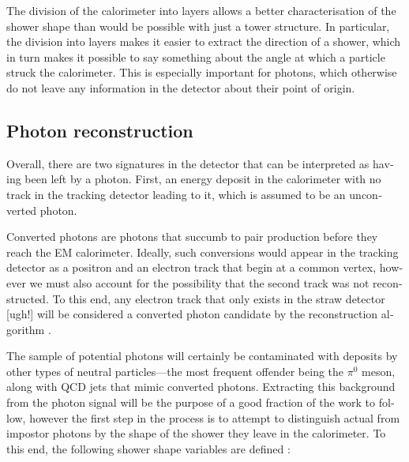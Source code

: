 \begin{english}
The division of the calorimeter into layers allows a better characterisation of the shower shape than would be possible with just a tower structure. In particular, the division into layers makes it easier to extract the direction of a shower, which in turn makes it possible to say something about the angle at which a particle struck the calorimeter. This is especially important for photons, which otherwise do not leave any information in the detector about their point of origin.

\subsection{Photon reconstruction}

Overall, there are two signatures in the detector that can be interpreted as having been left by a photon. First, an energy deposit in the calorimeter with no track in the tracking detector leading to it, which is assumed to be an unconverted photon.

Converted photons are photons that succumb to pair production before they reach the EM calorimeter. Ideally, such conversions would appear in the tracking detector as a positron and an electron track that begin at a common vertex, however we must also account for the possibility that the second track was not reconstructed. To this end, any electron track that only exists in the straw detector [ugh!] will be considered a converted photon candidate by the reconstruction algorithm \cite{phorec}.

The sample of potential photons will certainly be contaminated with deposits by other types of neutral particles---the most frequent offender being the $\pi^0$ meson, along with QCD jets that mimic converted photons. Extracting this background from the photon signal will be the purpose of a good fraction of the work to follow, however the first step in the process is to attempt to distinguish actual from impostor photons by the shape of the shower they leave in the calorimeter. To this end, the following shower shape variables are defined \cite{Carminati}:


\end{english}
